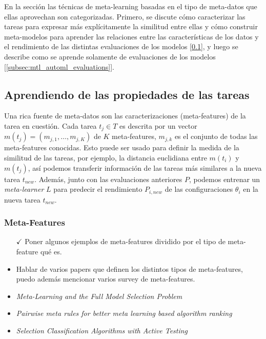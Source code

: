 En la sección las técnicas de meta-learning basadas en el tipo de meta-datos que ellas aprovechan son categorizadas. Primero, se discute cómo caracterizar las tareas para expresar más explícitamente la similitud entre ellas y cómo construir meta-modelos para aprender las relaciones entre las características de los datos y el rendimiento de las distintas evaluaciones de los modelos [\ref{subsec:mtl_automl_proprerties}], y luego se describe como se aprende solamente de evaluaciones de los modelos [\ref{subsec:mtl_automl_evaluations}].

\subsection{Aprendiendo de las propiedades de las tareas}\label{subsec:mtl_automl_proprerties}

Una rica fuente de meta-datos son las caracterizaciones (meta-features) de la tarea en cuestión. Cada tarea $t_j \in T$ es descrita por un vector $m(t_j) = (m_{j,1}, …, m_{j,K})$ de $K$ meta-features, $m_{j,k}$ es el conjunto de todas las meta-features conocidas. Esto puede ser usado para definir la medida de la similitud de las tareas, por ejemplo, la distancia euclidiana entre $m(t_i)$ y $m(t_j)$, así podemos transferir información de las tareas más similares a la nueva tarea $t_{new}$. Además, junto con las evaluaciones anteriores $P$, podemos entrenar un \emph{meta-learner} $L$ para predecir el rendimiento $P_{i, new}$ de las configuraciones $\theta_i$ en la nueva tarea $t_{new}$. 

\subsubsection{Meta-Features}

\begin{itemize}
	\item[$\checkmark$] Poner algunos ejemplos de meta-features dividido por el tipo de meta-feature qué es.
	\item Hablar de varios papers que definen los distintos tipos de meta-features, puedo además mencionar varios survey de meta-features.
	\item \textit{Meta-Learning and the Full Model Selection Problem}
	\item \textit{Pairwise meta rules for better meta learning based algorithm ranking}
	\item \textit{Selection Classification Algorithms with Active Testing}
\end{itemize}

